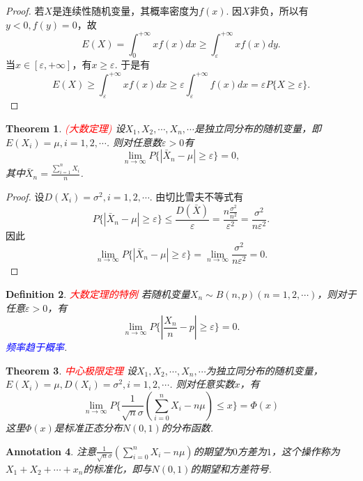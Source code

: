 \documentclass{article}
\newtheorem{theorem}{Theorem}[section]
\newtheorem{definition}[theorem]{Definition}
\newtheorem{annotation}[theorem]{Annotation}
\newcommand{\redt}[1]{\textcolor{red}{#1}}
\newcommand{\bluet}[1]{\textcolor{blue}{#1}}
\begin{document}
\begin{proof}
若$X$是连续性随机变量，其概率密度为$f(x)$. 因$X$非负，所以有$y < 0,f(y)=0$，故
$$
E(X) = \int_{0}^{+\infty} xf(x)dx \geq  \int_{\varepsilon}^{+\infty} xf(x)dy.
$$
当$x \in [\varepsilon,+\infty]$，有$x \geq \varepsilon$. 于是有
$$
E(X) \geq \int_{\varepsilon}^{+\infty} xf(x)dx \geq \varepsilon \int_{\varepsilon}^{+\infty}f(x)dx = \varepsilon P\{X \geq \varepsilon\}.
$$
\end{proof}

\begin{theorem}
\rm \redt{(大数定理)} 设$X_1,X_2,\cdots,X_n,\cdots$是独立同分布的随机变量，即$E(X_i) = \mu,i=1,2,\cdots$. 则对任意数$\varepsilon > 0$有
$$
\lim\limits_{n \rightarrow \infty}P\{|\bar{X}_n -\mu| \geq \varepsilon\} = 0,
$$ 
其中$\bar{X}_n = \frac{\sum\limits_{i=1}^n X_i}{n}$. 
\end{theorem}

\begin{proof}
设$D(X_i) = \sigma^2, i =1,2,\cdots$. 由切比雪夫不等式有
$$
P\{|\bar{X}_n -\mu| \geq \varepsilon\} \leq \frac{D(\bar{X})}{\varepsilon} = \frac{n\frac{\sigma^2}{n^2}}{\varepsilon^2} = \frac{\sigma^2}{n\varepsilon^2}. 
$$
因此
$$
\lim\limits_{n \rightarrow \infty} P\{|\bar{X}_n -\mu| \geq \varepsilon\} = \lim\limits_{n \rightarrow \infty} \frac{\sigma^2}{n\varepsilon^2} = 0.
$$
\end{proof}

\begin{definition}
\rm \redt{大数定理的特例} 若随机变量$X_n \sim B(n,p)(n=1,2,\cdots)$，则对于任意$\varepsilon > 0$，有
$$
\lim\limits_{n \rightarrow \infty}P\{|\frac{X_n}{n} -p| \geq \varepsilon\} = 0.
$$
\bluet{频率趋于概率}. 
\end{definition}

\begin{theorem}
\rm \redt{中心极限定理} 设$X_1,X_2,\cdots,X_n,\cdots$为独立同分布的随机变量，$E(X_i)=\mu,D(X_i)=\sigma^2,i=1,2,\cdots$. 则对任意实数$x$，有
$$
\lim\limits_{n \rightarrow \infty}P\{\frac{1}{\sqrt{n}\sigma}(\sum\limits_{i=0}^nX_i - n\mu) \leq x\} = \Phi(x)
$$
这里$\Phi(x)$是标准正态分布$N(0,1)$的分布函数. 
\end{theorem}



\begin{annotation}
\rm 注意$\frac{1}{\sqrt{n}\sigma}(\sum\limits_{i=0}^nX_i - n\mu)$的期望为$0$方差为$1$，这个操作称为$X_1 + X_2 +\cdots + x_n$的标准化，即与$N(0,1)$的期望和方差符号. 
\end{annotation}
\end{document}
